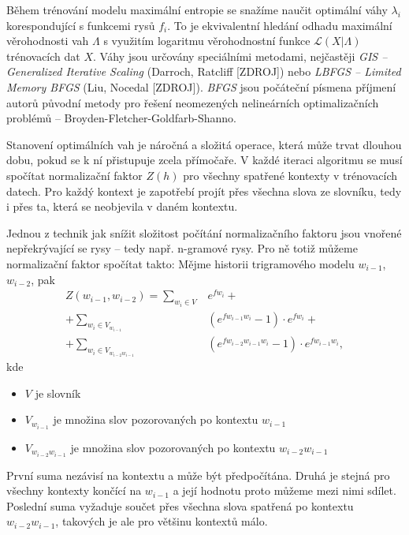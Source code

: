 \documentclass[12pt,a4paper]{report}
\begin{document}
Během trénování modelu maximální entropie se snažíme naučit optimální váhy $\lambda_i$ korespondující s funkcemi rysů $f_i$. To je ekvivalentní hledání odhadu maximální věrohodnosti vah $\Lambda$ s využitím logaritmu věrohodnostní funkce $\mathcal{L}(X|\Lambda)$ trénovacích dat $X$. Váhy jsou určovány speciálními metodami, nejčastěji \textit{GIS -- Generalized Iterative Scaling} (Darroch, Ratcliff [ZDROJ]) nebo \textit{LBFGS -- Limited Memory BFGS} (Liu, Nocedal [ZDROJ]). \textit{BFGS} jsou počáteční písmena příjmení autorů původní metody pro řešení neomezených nelineárních optimalizačních problémů -- Broyden-Fletcher-Goldfarb-Shanno.

Stanovení optimálních vah je náročná a složitá operace, která může trvat dlouhou dobu, pokud se k ní přistupuje zcela přímočaře. V každé iteraci algoritmu se musí spočítat normalizační faktor $Z(h)$ pro všechny spatřené kontexty v trénovacích datech. Pro každý kontext je zapotřebí projít přes všechna slova ze slovníku, tedy i přes ta, která se neobjevila v daném kontextu.

Jednou z technik jak snížit složitost počítání normalizačního faktoru jsou vnořené nepřekrývající se rysy -- tedy např. n-gramové rysy. Pro ně totiž můžeme normalizační faktor spočítat takto: Mějme historii trigramového modelu $w_{i-1}$, $w_{i-2}$, pak
\begin{equation}
\begin{split}
Z(w_{i-1}, w_{i-2}) = \sum_{w_i \in V} & e^{fw_i} + \\ 
+ \sum_{w_i \in V_{w_{i-1}}} & (e^{fw_{i-1}w_i} - 1) \cdot e^{fw_i} + \\
+ \sum_{w_i \in V_{w_{i-2} w_{i-1}}} & (e^{fw_{i-2}w_{i-1}w_i} -1) \cdot e^{fw_{i-1}w_i},
\end{split}
\end{equation}
kde \begin{itemize}
\item{$V$ je slovník}
\item{$V_{w_{i-1}}$ je množina slov pozorovaných po kontextu $w_{i-1}$}
\item{$V_{w_{i-2}w_{i-1}}$ je množina slov pozorovaných po kontextu $w_{i-2}w_{i-1}$}
\end{itemize}
První suma nezávisí na kontextu a může být předpočítána. Druhá je stejná pro všechny kontexty končící na $w_{i-1}$ a její hodnotu proto můžeme mezi nimi sdílet. Poslední suma vyžaduje součet přes všechna slova spatřená po kontextu $w_{i-2}w_{i-1}$, takových je ale pro většinu kontextů málo.
\end{document}
